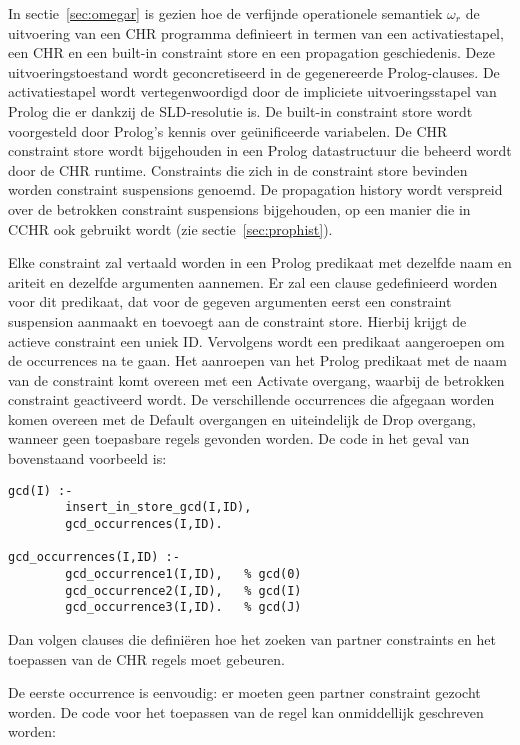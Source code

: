 In sectie~\ref{sec:omegar} is gezien hoe de verfijnde operationele semantiek $\omega_r$ de uitvoering van een CHR programma definieert in termen van een activatiestapel, een CHR en een built-in constraint store en een propagation geschiedenis. Deze uitvoeringstoestand wordt geconcretiseerd in de gegenereerde Prolog-clauses. De activatiestapel wordt vertegenwoordigd door de impliciete uitvoeringsstapel van Prolog die er dankzij de SLD-resolutie is. De built-in constraint store wordt voorgesteld door Prolog's kennis over ge\"unificeerde variabelen. De CHR constraint store wordt bijgehouden in een Prolog datastructuur die beheerd wordt door de CHR runtime. Constraints die zich in de constraint store bevinden worden constraint suspensions genoemd. De propagation history wordt verspreid over de betrokken constraint suspensions bijgehouden, op een manier die in CCHR ook gebruikt wordt (zie sectie~\ref{sec:prophist}).

Elke constraint zal vertaald worden in een Prolog predikaat met dezelfde naam en ariteit en dezelfde argumenten aannemen. Er zal een clause gedefinieerd worden voor dit predikaat, dat voor de gegeven argumenten eerst een constraint suspension aanmaakt en toevoegt aan de constraint store. Hierbij krijgt de actieve constraint een uniek ID. Vervolgens wordt een predikaat aangeroepen om de occurrences na te gaan. Het aanroepen van het Prolog predikaat met de naam van de constraint komt overeen met een Activate overgang, waarbij de betrokken constraint geactiveerd wordt. De verschillende occurrences die afgegaan worden komen overeen met de Default overgangen en uiteindelijk de Drop overgang, wanneer geen toepasbare regels gevonden worden. De code in het geval van bovenstaand voorbeeld is:

{\scriptsize \begin{Verbatim}[frame=single]
gcd(I) :-
        insert_in_store_gcd(I,ID),
        gcd_occurrences(I,ID).

gcd_occurrences(I,ID) :-
        gcd_occurrence1(I,ID),   % gcd(0)
        gcd_occurrence2(I,ID),   % gcd(I)
        gcd_occurrence3(I,ID).   % gcd(J)
\end{Verbatim}
}

Dan volgen clauses die defini\"eren hoe het zoeken van partner constraints en het toepassen van de CHR regels moet gebeuren.

De eerste occurrence is eenvoudig: er moeten geen partner constraint gezocht worden. De code voor het toepassen van de regel kan onmiddellijk geschreven worden:

